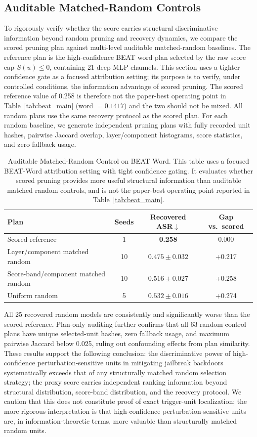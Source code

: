 \documentclass[lettersize,journal]{IEEEtran}
\begin{document}
\subsection{Auditable Matched-Random Controls}
To rigorously verify whether the score carries structural discriminative information beyond random pruning and recovery dynamics, we compare the scored pruning plan against multi-level auditable matched-random baselines. The reference plan is the high-confidence BEAT word plan selected by the raw score cap $S(u)\le 0$, containing 21 deep MLP channels. This section uses a tighter confidence gate as a focused attribution setting; its purpose is to verify, under controlled conditions, the information advantage of scored pruning. The scored reference value of 0.258 is therefore not the paper-best operating point in Table~\ref{tab:beat_main} (word $=0.1417$) and the two should not be mixed. All random plans use the same recovery protocol as the scored plan. For each random baseline, we generate independent pruning plans with fully recorded unit hashes, pairwise Jaccard overlap, layer/component histograms, score statistics, and zero fallback usage.

\begin{table}[!t]
\caption{Auditable Matched-Random Control on BEAT Word. This table uses a focused BEAT-Word attribution setting with tight confidence gating. It evaluates whether scored pruning provides more useful structural information than auditable matched random controls, and is not the paper-best operating point reported in Table~\ref{tab:beat_main}.}
\label{tab:matched_random}
\centering
\begin{tabular}{lccc}
\toprule
Plan & Seeds & Recovered ASR$\downarrow$ & Gap vs.\ scored \\
\midrule
Scored reference & 1 & \textbf{0.258} & 0.000 \\
Layer/component matched random & 10 & $0.475\pm0.032$ & +0.217 \\
Score-band/component matched random & 10 & $0.516\pm0.027$ & +0.258 \\
Uniform random & 5 & $0.532\pm0.016$ & +0.274 \\
\bottomrule
\end{tabular}
\end{table}

All 25 recovered random models are consistently and significantly worse than the scored reference. Plan-only auditing further confirms that all 63 random control plans have unique selected-unit hashes, zero fallback usage, and maximum pairwise Jaccard below 0.025, ruling out confounding effects from plan similarity. These results support the following conclusion: the discriminative power of high-confidence perturbation-sensitive units in mitigating jailbreak backdoors systematically exceeds that of any structurally matched random selection strategy; the proxy score carries independent ranking information beyond structural distribution, score-band distribution, and the recovery protocol. We caution that this does not constitute proof of exact trigger-unit localization; the more rigorous interpretation is that high-confidence perturbation-sensitive units are, in information-theoretic terms, more valuable than structurally matched random units.
\end{document}
